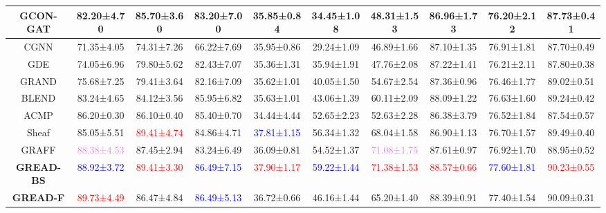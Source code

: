 \documentclass{article}
\theoremstyle{plain}
\theoremstyle{definition}
\theoremstyle{remark}
\newcommand{\std}{\scriptsize{}}
\newcommand{\BEST}[1]{\textcolor{red}{#1}}
\newcommand{\SECOND}[1]{\textcolor{blue}{#1}}
\newcommand{\THIRD}[1]{\textcolor{violet}{#1}}
\begin{document}
\begin{table}[ht]
\begin{tabular}{c ccccccccc}
        GCON-GAT    & 82.20\std{±4.70} & 85.70\std{±3.60} & 83.20\std{±7.00} & 35.85\std{±0.84} & 34.45\std{±1.08} & 48.31\std{±1.53} & 86.96\std{±1.73} & 76.20±\std{2.12} & 87.73\std{±0.41}\\
        \midrule
        CGNN	    & 71.35\std{±4.05} & 74.31\std{±7.26} & 66.22\std{±7.69} & 35.95\std{±0.86} & 29.24\std{±1.09} & 46.89\std{±1.66} & 87.10\std{±1.35} & 76.91\std{±1.81} & 87.70\std{±0.49}\\
        GDE 	    & 74.05\std{±6.96} & 79.80\std{±5.62} & 82.43\std{±7.07} & 35.36\std{±1.31} & 35.94\std{±1.91} & 47.76\std{±2.08} & 87.22\std{±1.41} & 76.21\std{±2.11} & 87.80\std{±0.38}\\
        GRAND       & 75.68\std{±7.25} & 79.41\std{±3.64} & 82.16\std{±7.09} & 35.62\std{±1.01} & 40.05\std{±1.50} & 54.67\std{±2.54} & 87.36\std{±0.96} & 76.46\std{±1.77} & 89.02\std{±0.51}\\
        BLEND       & 83.24\std{±4.65} & 84.12\std{±3.56} & 85.95\std{±6.82} & 35.63\std{±1.01} & 43.06\std{±1.39} & 60.11\std{±2.09} & 88.09\std{±1.22} & 76.63\std{±1.60} & 89.24\std{±0.42}\\
        ACMP        & 86.20\std{±0.30} & 86.10\std{±0.40} & 85.40\std{±0.70} & 34.44\std{±4.44} & 52.65\std{±2.23} & 52.63\std{±2.28} & 86.38\std{±3.79} & 76.52±\std{1.84} & 87.54\std{±0.57}\\
        Sheaf       & 85.05\std{±5.51} & \BEST{89.41\std{±4.74}} & 84.86\std{±4.71} & \SECOND{37.81\std{±1.15}} & 56.34\std{±1.32} & 68.04\std{±1.58} & 86.90\std{±1.13} & 76.70±\std{1.57} & 89.49\std{±0.40}\\
        GRAFF       & \THIRD{88.38\std{±4.53}} & 87.45\std{±2.94} & 83.24\std{±6.49} & 36.09\std{±0.81} & 54.52\std{±1.37} & \THIRD{71.08\std{±1.75}} & 87.61\std{±0.97} & 76.92±\std{1.70} & 88.95\std{±0.52}\\
        \midrule
        \textbf{GREAD-BS}
                    & \SECOND{88.92\std{±3.72}} & \BEST{89.41\std{±3.30}} & \SECOND{86.49\std{±7.15}} 
                    & \BEST{37.90\std{±1.17}} & \SECOND{59.22\std{±1.44}} & \BEST{71.38\std{±1.53}} 
                    & \BEST{88.57\std{±0.66}} & \SECOND{77.60\std{±1.81}} & \BEST{90.23\std{±0.55}}\\
        \textbf{GREAD-F} 
                    & \BEST{89.73\std{±4.49}} & 86.47\std{±4.84} & \SECOND{86.49\std{±5.13}}
                    & 36.72\std{±0.66}	& 46.16\std{±1.44} & 65.20\std{±1.40} 
                    & 88.39\std{±0.91} & 77.40\std{±1.54}	& 90.09\std{±0.31}\\

\end{tabular}
\end{table}
\end{document}

